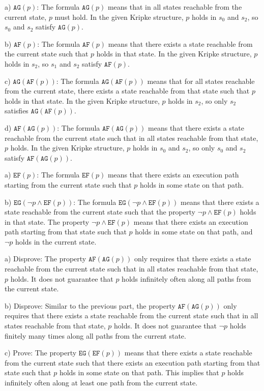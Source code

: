 \documentclass[11pt]{article}
\newcommand{\af}[1]{\texttt{AF}(#1)}
\newcommand{\ef}[1]{\texttt{EF}(#1)}
\newcommand{\ag}[1]{\texttt{AG}(#1)}
\newcommand{\eg}[1]{\texttt{EG}(#1)}
\begin{document}
a) $\ag{p}$: The formula $\ag{p}$ means that in all states reachable from the current state, $p$ must hold. In the given Kripke structure, $p$ holds in $s_0$ and $s_2$, so $s_0$ and $s_2$ satisfy $\ag{p}$.

b) $\af{p}$: The formula $\af{p}$ means that there exists a state reachable from the current state such that $p$ holds in that state. In the given Kripke structure, $p$ holds in $s_2$, so $s_1$ and $s_2$ satisfy $\af{p}$.

c) $\ag{\af{p}}$: The formula $\ag{\af{p}}$ means that for all states reachable from the current state, there exists a state reachable from that state such that $p$ holds in that state. In the given Kripke structure, $p$ holds in $s_2$, so only $s_2$ satisfies $\ag{\af{p}}$.

d) $\af{\ag{p}}$: The formula $\af{\ag{p}}$ means that there exists a state reachable from the current state such that in all states reachable from that state, $p$ holds. In the given Kripke structure, $p$ holds in $s_0$ and $s_2$, so only $s_0$ and $s_2$ satisfy $\af{\ag{p}}$.

a) $\ef{p}$: The formula $\ef{p}$ means that there exists an execution path starting from the current state such that $p$ holds in some state on that path.

b) $\eg{\neg p \land \ef{p}}$: The formula $\eg{\neg p \land \ef{p}}$ means that there exists a state reachable from the current state such that the property $\neg p \land \ef{p}$ holds in that state. The property $\neg p \land \ef{p}$ means that there exists an execution path starting from that state such that $p$ holds in some state on that path, and $\neg p$ holds in the current state.

a) Disprove: The property $\af{\ag{p}}$ only requires that there exists a state reachable from the current state such that in all states reachable from that state, $p$ holds. It does not guarantee that $p$ holds infinitely often along all paths from the current state.

b) Disprove: Similar to the previous part, the property $\af{\ag{p}}$ only requires that there exists a state reachable from the current state such that in all states reachable from that state, $p$ holds. It does not guarantee that $\neg p$ holds finitely many times along all paths from the current state.

c) Prove: The property $\eg{\ef{p}}$ means that there exists a state reachable from the current state such that there exists an execution path starting from that state such that $p$ holds in some state on that path. This implies that $p$ holds infinitely often along at least one path from the current state.
\end{document}
